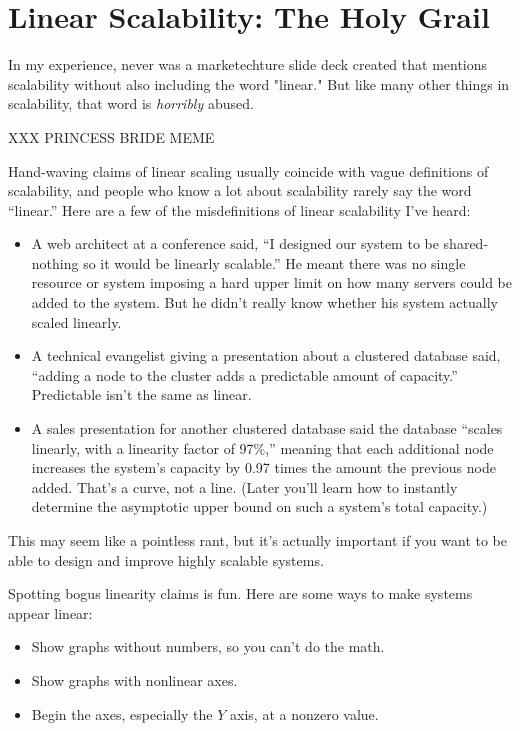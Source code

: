 \documentclass{vivid_layout}
\begin{document}
\section{Linear Scalability: The Holy Grail}

In my experience, never was a marketechture slide deck created that mentions
scalability without also including the word "linear." But like many other things
in scalability, that word is {\itshape horribly} abused.

XXX PRINCESS BRIDE MEME

Hand-waving claims of linear scaling usually coincide with vague definitions
of scalability, and people who know a lot about scalability rarely say the word
``linear.'' Here are a few of the misdefinitions of linear scalability I've heard:

\begin{itemize}
\item A web architect at a conference said, ``I designed our system to be
shared-nothing so it would be linearly scalable.'' He meant there was no
single resource or system imposing a hard upper limit on how many servers could
be added to the system. But he didn't really know whether his system actually
scaled linearly.
\item A technical evangelist giving a presentation about a clustered database
said, ``adding a node to the cluster adds a predictable amount of capacity.''
Predictable isn't the same as linear.
\item A sales presentation for another clustered database said the database
``scales linearly, with a linearity factor of 97\%,'' meaning that each
additional node increases the system's capacity by 0.97 times the amount the
previous node added. That's a curve, not a line.  (Later you'll learn how to
instantly determine the asymptotic upper bound on such a system's total
capacity.)
\end{itemize}

This may seem like a pointless rant, but it's actually important if you want to
be able to design and improve highly scalable systems.

Spotting bogus linearity claims is fun. Here are some ways
to make systems appear linear:

\begin{itemize}
\item Show graphs without numbers, so you can't do the math.
\item Show graphs with nonlinear axes.
\item Begin the axes, especially the $Y$ axis, at a nonzero value.
\end{itemize}
\end{document}
